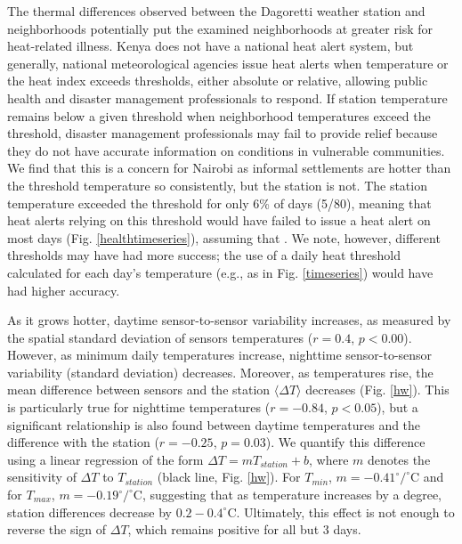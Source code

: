 The thermal differences observed between the Dagoretti weather station and neighborhoods potentially put the examined neighborhoods at greater risk for heat-related illness.%
Kenya does not have a national heat alert system, but generally, national meteorological agencies issue heat alerts when temperature or the heat index exceeds thresholds, either absolute or relative, allowing public health and disaster management professionals to respond. If station temperature remains below a given threshold when neighborhood temperatures exceed the threshold, disaster management professionals may fail to provide relief because they do not have accurate information on conditions in vulnerable communities.  
We find that this is a concern for Nairobi as informal settlements are hotter than the threshold temperature so consistently, but the station is not. 
The station temperature exceeded the \cite{egondi2012} threshold for only 6\% of days (5/80), meaning that heat alerts relying on this threshold would have failed to issue a heat alert on most days (Fig. \ref{healthtimeseries}), assuming that . We note, however, different thresholds may have had more success; the use of a daily heat threshold calculated for each day's temperature (e.g., as in Fig. \ref{timeseries}) would have had higher accuracy. 

As it grows hotter, daytime sensor-to-sensor variability increases, as measured by the spatial standard deviation of sensors temperatures ($r = 0.4$, $p < 0.00$). However, as minimum daily temperatures increase, nighttime sensor-to-sensor variability (standard deviation) decreases. 
Moreover, as temperatures rise, the mean difference between sensors and the station $\langle \Delta T \rangle $ decreases (Fig. \ref{hw}). This is particularly true for nighttime temperatures ($r = -0.84$, $p <0.05$), but a significant relationship is also found between daytime temperatures and the difference with the station ($r = -0.25$, $p = 0.03$). We quantify this difference using a linear regression of the form $\Delta T=m T_{station}+b$, where $m$  denotes the sensitivity of $\Delta T$ to $T_{station}$ (black line, Fig. \ref{hw}). For $T_{min}$, $m = -0.41 ^\circ/^\circ$C and for $T_{max}$, $m = -0.19^\circ/^\circ$C, suggesting that as temperature increases by a degree, station differences decrease by $0.2-0.4 ^\circ $C. Ultimately, this effect is not enough to reverse the sign of $\Delta T$, which remains positive for all but 3 days. 

